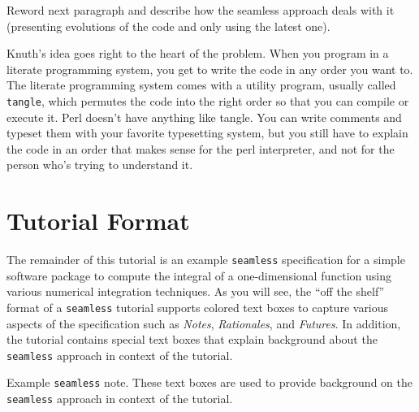 \begin{TODO}
Reword next paragraph and describe how the seamless approach deals with it (presenting evolutions of the
code and only using the latest one).
\end{TODO}
Knuth's idea goes right to the heart of the problem. When you program in a literate programming system, you get to write the code in any order you want to. The literate programming system comes with a utility program, usually called 
\lstinline{tangle}, which permutes the code into the right order so that you can compile or execute it.
Perl doesn't have anything like tangle. You can write comments and typeset them with your favorite typesetting system, but you still have to explain the code in an order that makes sense for the perl interpreter, and not for the person who's trying to understand it.

\section{Tutorial Format}

The remainder of this tutorial is an example \lstinline{seamless} specification for a simple software package
to compute the integral of a one-dimensional function using various numerical integration techniques. As you will
see, the ``off the shelf'' format of a \lstinline{seamless} tutorial supports colored text boxes to capture
various aspects of the specification such as \textit{Notes}, \textit{Rationales}, and \textit{Futures}. In addition,
the tutorial contains special text boxes that explain background about the \lstinline{seamless} approach in context
of the tutorial.

\begin{seamlessnote}
  Example \lstinline{seamless} note. These text boxes are used to provide background on the \lstinline{seamless}
  approach in context of the tutorial.
\end{seamlessnote}

